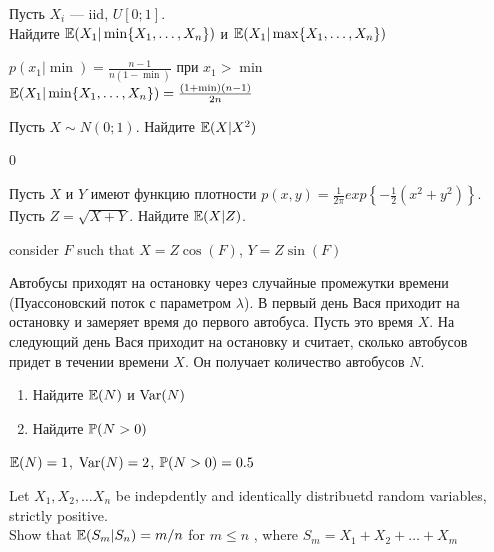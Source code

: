 \begin{problem}
Пусть $X_{i}$ --- iid, $U[0;1]$. \\
Найдите $\E(X_{1}|\min\{X_{1},\ldots,X_{n}\})$ и
$\E(X_{1}|\max\{X_{1},\ldots,X_{n}\})$ 
\end{problem} 
\begin{solution} 

$p(x_{1}|\min)=\frac{n-1}{n(1-\min)}$ при $x_{1}>\min$ \\
$\E(X_{1}|\min\{X_{1},\ldots,X_{n}\})=\frac{(1+\min)(n-1)}{2n}$ 
\end{solution}

\begin{problem}
Пусть $X\sim N(0;1)$. Найдите $\E(X|X^{2})$ 
\end{problem} 
\begin{solution} 
0
\end{solution}

\begin{problem}
Пусть $X$ и $Y$ имеют функцию плотности
$p(x,y)=\frac{1}{2\pi}exp\left\{-\frac{1}{2}\left(x^{2}+y^{2}\right)\right\}$.\\
Пусть $Z=\sqrt{X+Y}$. Найдите $\E(X|Z)$. 
\end{problem} 
\begin{solution} 

 consider $F$ such that $X=Z\cos(F)$, $Y=Z\sin(F)$ 
\end{solution}

\begin{problem}
Автобусы приходят на остановку через случайные промежутки времени (Пуассоновский поток с параметром $\lambda$). В первый день Вася приходит на остановку и замеряет время до первого автобуса. Пусть это время $X$. На следующий день Вася приходит на остановку и считает, сколько автобусов придет в течении времени $X$. Он получает количество автобусов $N$. 
\begin{enumerate}
\item Найдите $\E(N)$ и $\Var(N)$
\item Найдите $\P(N>0)$
\end{enumerate}
 
\end{problem} 
\begin{solution} 
$\E(N)=1$, $\Var(N)=2$, $\P(N>0)=0.5$
\end{solution}

\begin{problem}
Let $X_1, X_2, \ldots X_n$ be indepdently and identically distribuetd random variables, strictly positive. \\
Show that $\E(S_{m}|S_{n})= m/n$ for $m\le n$ , where $S_{m} = X_{1} + X_{2} + \ldots + X_{m}$ 
\end{problem} 
\begin{solution} 

\end{solution}

